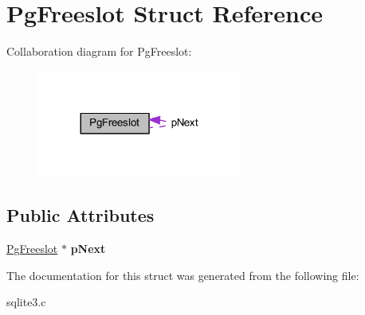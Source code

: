 \hypertarget{struct_pg_freeslot}{\section{Pg\-Freeslot Struct Reference}
\label{struct_pg_freeslot}
}


Collaboration diagram for Pg\-Freeslot\-:\nopagebreak
\begin{figure}[H]
\begin{center}
\leavevmode
\includegraphics[width=191pt]{struct_pg_freeslot__coll__graph}
\end{center}
\end{figure}
\subsection*{Public Attributes}
\begin{DoxyCompactItemize}
\item 
\hypertarget{struct_pg_freeslot_ac38a6e51f86c650fb943585d7b6c8b70}{\hyperlink{struct_pg_freeslot}{Pg\-Freeslot} $\ast$ {\bfseries p\-Next}}\label{struct_pg_freeslot_ac38a6e51f86c650fb943585d7b6c8b70}

\end{DoxyCompactItemize}


The documentation for this struct was generated from the following file\-:\begin{DoxyCompactItemize}
\item 
sqlite3.\-c\end{DoxyCompactItemize}
